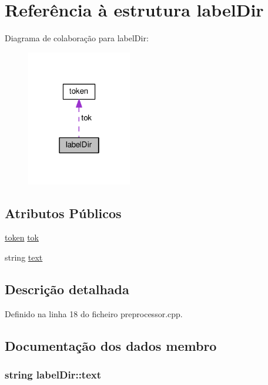 \hypertarget{structlabel_dir}{\section{Referência à estrutura label\-Dir}
\label{structlabel_dir}
}


Diagrama de colaboração para label\-Dir\-:
\nopagebreak
\begin{figure}[H]
\begin{center}
\leavevmode
\includegraphics[width=130pt]{structlabel_dir__coll__graph}
\end{center}
\end{figure}
\subsection*{Atributos Públicos}
\begin{DoxyCompactItemize}
\item 
\hyperlink{structtoken}{token} \hyperlink{structlabel_dir_a833846ebac6b8b7a0ee80a6083093e25}{tok}
\item 
string \hyperlink{structlabel_dir_ad9c433f36a95684cde33cf02833f8c02}{text}
\end{DoxyCompactItemize}


\subsection{Descrição detalhada}


Definido na linha 18 do ficheiro preprocessor.\-cpp.



\subsection{Documentação dos dados membro}
\hypertarget{structlabel_dir_ad9c433f36a95684cde33cf02833f8c02}{
\subsubsection[{text}]{\setlength{\rightskip}{0pt plus 5cm}string label\-Dir\-::text}}\label{structlabel_dir_ad9c433f36a95684cde33cf02833f8c02}


